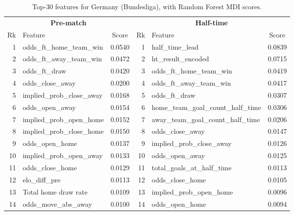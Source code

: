 \documentclass[pdflatex,sn-mathphys-num]{sn-jnl}
\theoremstyle{thmstyleone}
\theoremstyle{thmstyletwo}
\theoremstyle{thmstylethree}
\begin{document}
\begin{table}[h]
\caption{Top-30 features for Germany (Bundesliga), with Random Forest MDI scores.}\label{tab:fi-ger}
\footnotesize
\begin{tabular*}{\textwidth}{@{\extracolsep\fill}rlc|rlc@{}}
\toprule
\multicolumn{3}{c|}{\textbf{Pre-match}} & \multicolumn{3}{c}{\textbf{Half-time}} \\
Rk & Feature & Score & Rk & Feature & Score \\
\midrule
1  & odds\_ft\_home\_team\_win          & 0.0540 & 1  & half\_time\_lead                       & 0.0839 \\
2  & odds\_ft\_away\_team\_win          & 0.0472 & 2  & ht\_result\_encoded                    & 0.0715 \\
3  & odds\_ft\_draw                     & 0.0420 & 3  & odds\_ft\_home\_team\_win               & 0.0419 \\
4  & odds\_close\_away                  & 0.0200 & 4  & odds\_ft\_away\_team\_win               & 0.0417 \\
5  & implied\_prob\_close\_away          & 0.0168 & 5  & odds\_ft\_draw                          & 0.0307 \\
6  & odds\_open\_away                   & 0.0154 & 6  & home\_team\_goal\_count\_half\_time     & 0.0306 \\
7  & implied\_prob\_open\_home           & 0.0152 & 7  & away\_team\_goal\_count\_half\_time     & 0.0206 \\
8  & implied\_prob\_close\_home          & 0.0150 & 8  & odds\_close\_away                       & 0.0147 \\
9  & odds\_open\_home                   & 0.0137 & 9  & implied\_prob\_close\_away              & 0.0126 \\
10 & implied\_prob\_open\_away           & 0.0133 & 10 & odds\_open\_away                        & 0.0125 \\
11 & odds\_close\_home                  & 0.0129 & 11 & total\_goals\_at\_half\_time            & 0.0113 \\
12 & elo\_diff\_pre                     & 0.0113 & 12 & odds\_close\_home                       & 0.0105 \\
13 & Total home draw rate               & 0.0109 & 13 & implied\_prob\_open\_home               & 0.0096 \\
14 & odds\_move\_abs\_away               & 0.0100 & 14 & odds\_open\_home                        & 0.0094 \\

\end{tabular*}
\end{table}
\end{document}
